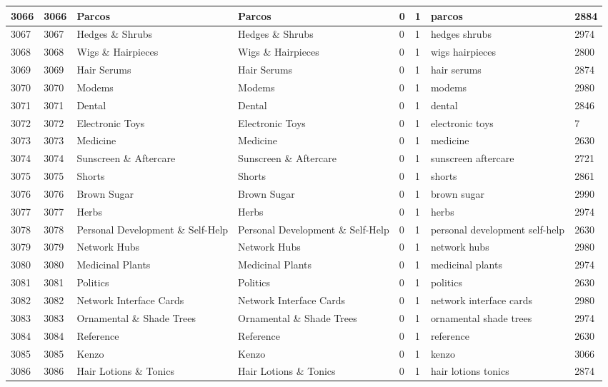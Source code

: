 \begin{longtable}{|l|l|l|l|l|l|l|l|}
3066 & 3066 & Parcos & Parcos & 0 & 1 & parcos & 2884 \\ \hline 
3067 & 3067 & Hedges \& Shrubs & Hedges \& Shrubs & 0 & 1 & hedges shrubs & 2974 \\ \hline 
3068 & 3068 & Wigs \& Hairpieces & Wigs \& Hairpieces & 0 & 1 & wigs hairpieces & 2800 \\ \hline 
3069 & 3069 & Hair Serums & Hair Serums & 0 & 1 & hair serums & 2874 \\ \hline 
3070 & 3070 & Modems & Modems & 0 & 1 & modems & 2980 \\ \hline 
3071 & 3071 & Dental & Dental & 0 & 1 & dental & 2846 \\ \hline 
3072 & 3072 & Electronic Toys & Electronic Toys & 0 & 1 & electronic toys & 7 \\ \hline 
3073 & 3073 & Medicine & Medicine & 0 & 1 & medicine & 2630 \\ \hline 
3074 & 3074 & Sunscreen \& Aftercare & Sunscreen \& Aftercare & 0 & 1 & sunscreen aftercare & 2721 \\ \hline 
3075 & 3075 & Shorts & Shorts & 0 & 1 & shorts & 2861 \\ \hline 
3076 & 3076 & Brown Sugar & Brown Sugar & 0 & 1 & brown sugar & 2990 \\ \hline 
3077 & 3077 & Herbs & Herbs & 0 & 1 & herbs & 2974 \\ \hline 
3078 & 3078 & Personal Development \& Self-Help & Personal Development \& Self-Help & 0 & 1 & personal development self-help & 2630 \\ \hline 
3079 & 3079 & Network Hubs & Network Hubs & 0 & 1 & network hubs & 2980 \\ \hline 
3080 & 3080 & Medicinal Plants & Medicinal Plants & 0 & 1 & medicinal plants & 2974 \\ \hline 
3081 & 3081 & Politics & Politics & 0 & 1 & politics & 2630 \\ \hline 
3082 & 3082 & Network Interface Cards & Network Interface Cards & 0 & 1 & network interface cards & 2980 \\ \hline 
3083 & 3083 & Ornamental \& Shade Trees & Ornamental \& Shade Trees & 0 & 1 & ornamental shade trees & 2974 \\ \hline 
3084 & 3084 & Reference & Reference & 0 & 1 & reference & 2630 \\ \hline 
3085 & 3085 & Kenzo & Kenzo & 0 & 1 & kenzo & 3066 \\ \hline 
3086 & 3086 & Hair Lotions \& Tonics & Hair Lotions \& Tonics & 0 & 1 & hair lotions tonics & 2874 \\ \hline 

\end{longtable}
